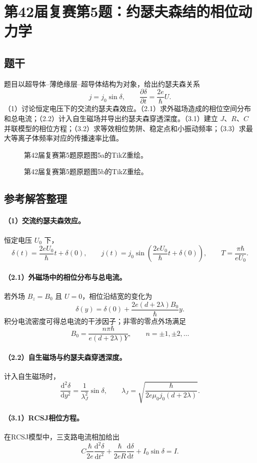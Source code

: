 \section{第42届复赛第5题：约瑟夫森结的相位动力学}
\subsection{题干}
题目以超导体--薄绝缘层--超导体结构为对象，给出约瑟夫森关系
\[j=j_0\sin\delta,\qquad \frac{\partial\delta}{\partial t}=\frac{2e}{\hbar}U.\]
（1）讨论恒定电压下的交流约瑟夫森效应。（2.1）求外磁场造成的相位空间分布和总电流；（2.2）计入自生磁场并导出约瑟夫森穿透深度。（3.1）建立 $J$、$R$、$C$ 并联模型的相位方程；（3.2）求等效相位势阱、稳定点和小振动频率；（3.3）求最大等离子体频率对应的传播速率比值。
\begin{figure}[htbp]\centering\caption{第42届复赛第5题原题图5a的TikZ重绘。}\end{figure}
\begin{figure}[htbp]\centering\caption{第42届复赛第5题原题图5b的TikZ重绘。}\end{figure}
\subsection{参考解答整理}
\paragraph{（1）交流约瑟夫森效应。}
恒定电压 $U_0$ 下，
\[\delta(t)=\frac{2eU_0}{\hbar}t+\delta(0),\qquad j(t)=j_0\sin\!\left(\frac{2eU_0}{\hbar}t+\delta(0)\right),\qquad T=\frac{\pi\hbar}{eU_0}.\]
\paragraph{（2.1）外磁场中的相位分布与总电流。}
若外场 $B_z=B_0$ 且 $U=0$，相位沿结宽的变化为
\[\delta(y)=\delta(0)+\frac{2e(d+2\lambda)B_0}{\hbar}y.\]
积分电流密度可得总电流的干涉因子；非零的零点外场满足
\[B_0=\frac{n\pi\hbar}{e(d+2\lambda)Y},\qquad n=\pm1,\pm2,\ldots\]
\paragraph{（2.2）自生磁场与约瑟夫森穿透深度。}
计入自生磁场时，
\[\frac{\mathrm d^2\delta}{\mathrm dy^2}=\frac{1}{\lambda_J^2}\sin\delta,\qquad
\lambda_J=\sqrt{\frac{\hbar}{2e\mu_0j_0(d+2\lambda)}}.\]
\paragraph{（3.1）RCSJ相位方程。}
在RCSJ模型中，三支路电流相加给出
\[C\frac{\hbar}{2e}\frac{\mathrm d^2\delta}{\mathrm dt^2}+\frac{\hbar}{2eR}\frac{\mathrm d\delta}{\mathrm dt}+I_0\sin\delta=I.\]
